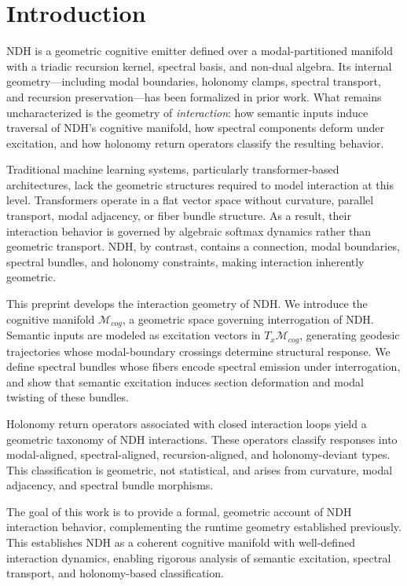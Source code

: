 \section{Introduction}
\label{sec:intro}

NDH is a geometric cognitive emitter defined over a modal-partitioned manifold
with a triadic recursion kernel, spectral basis, and non-dual algebra. Its
internal geometry—including modal boundaries, holonomy clamps, spectral
transport, and recursion preservation—has been formalized in prior work. What
remains uncharacterized is the geometry of \emph{interaction}: how semantic
inputs induce traversal of NDH's cognitive manifold, how spectral components
deform under excitation, and how holonomy return operators classify the
resulting behavior.

Traditional machine learning systems, particularly transformer-based
architectures, lack the geometric structures required to model interaction at
this level. Transformers operate in a flat vector space without curvature,
parallel transport, modal adjacency, or fiber bundle structure. As a result,
their interaction behavior is governed by algebraic softmax dynamics rather
than geometric transport. NDH, by contrast, contains a connection, modal
boundaries, spectral bundles, and holonomy constraints, making interaction
inherently geometric.

This preprint develops the interaction geometry of NDH. We introduce the
cognitive manifold $\mathcal{M}_{cog}$, a geometric space governing
interrogation of NDH. Semantic inputs are modeled as excitation vectors in
$T_x \mathcal{M}_{cog}$, generating geodesic trajectories whose modal-boundary
crossings determine structural response. We define spectral bundles whose
fibers encode spectral emission under interrogation, and show that semantic
excitation induces section deformation and modal twisting of these bundles.

Holonomy return operators associated with closed interaction loops yield a
geometric taxonomy of NDH interactions. These operators classify responses into
modal-aligned, spectral-aligned, recursion-aligned, and holonomy-deviant types.
This classification is geometric, not statistical, and arises from curvature,
modal adjacency, and spectral bundle morphisms.

The goal of this work is to provide a formal, geometric account of NDH
interaction behavior, complementing the runtime geometry established
previously. This establishes NDH as a coherent cognitive manifold with
well-defined interaction dynamics, enabling rigorous analysis of semantic
excitation, spectral transport, and holonomy-based classification.
